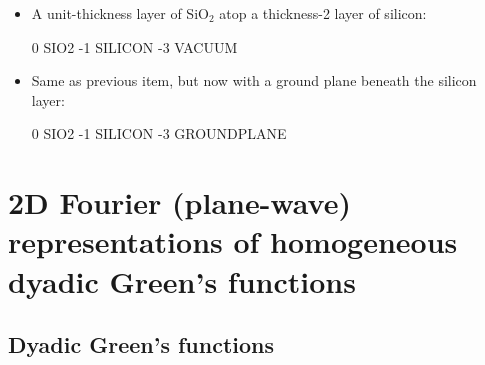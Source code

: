 \documentclass[letterpaper]{article}
\begin{document}
\begin{itemize}
\item A unit-thickness layer of SiO$_2$ atop a thickness-2 layer 
of silicon:

\medskip
\begin{verbcode}
 0 SIO2
-1 SILICON
-3 VACUUM
\end{verbcode}

\item Same as previous item, but now with a ground plane beneath
the silicon layer:

\medskip
\begin{verbcode}
 0 SIO2
-1 SILICON
-3 GROUNDPLANE
\end{verbcode}
\end{itemize}

\appendix
\newpage
\section{2D Fourier (plane-wave) representations of
         homogeneous dyadic Green's functions}

\subsection*{Dyadic Green's functions}
\end{document}
